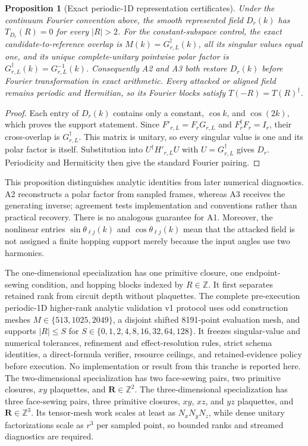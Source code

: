 \documentclass[11pt]{article}
\newenvironment{prospective}{\color{prospectivered}}{}
\newtheorem{proposition}{Proposition}
\begin{document}
\begin{prospective}
\begin{proposition}[Exact periodic-1D representation certificates]
Under the continuum Fourier convention above, the smooth represented field $D_r(k)$
has $T_{D_r}(R)=0$ for every $|R|>2$. For the constant-subspace control, the exact candidate-to-reference overlap
is $M(k)=G_{r,L}^\dagger(k)$, all its singular values equal one, and its unique
complete-unitary pointwise polar factor is
$G_{r,L}^\dagger(k)=G_{r,L}^{-1}(k)$. Consequently A2 and A3 both restore $D_r(k)$
before Fourier transformation in exact arithmetic. Every attacked or aligned field
remains periodic and Hermitian, so its Fourier blocks satisfy
$T(-R)=T(R)^\dagger$.
\end{proposition}

\begin{proof}
Each entry of $D_r(k)$ contains only a constant, $\cos k$, and $\cos(2k)$, which proves
the support statement. Since $F'_{r,L}=F_rG_{r,L}$ and
$F_r^\dagger F_r=I_r$, their cross-overlap is $G_{r,L}^\dagger$. This matrix is unitary,
so every singular value is one and its polar factor is itself. Substitution into
$U^\dagger H'_{r,L}U$ with $U=G_{r,L}^\dagger$ gives $D_r$. Periodicity and Hermiticity
then give the standard Fourier pairing.
\end{proof}

This proposition distinguishes analytic identities from later numerical diagnostics.
A2 reconstructs a polar factor from sampled frames, whereas A3 receives the generating
inverse; agreement tests implementation and conventions rather than practical recovery.
There is no analogous guarantee for A1. Moreover, the nonlinear entries
$\sin\theta_{\ell j}(k)$ and $\cos\theta_{\ell j}(k)$ mean that the attacked field is not
assigned a finite hopping support merely because the input angles use two harmonics.

The one-dimensional specialization has one primitive closure, one endpoint-sewing
condition, and hopping blocks indexed by $R\in\mathbb Z$. It first separates retained
rank from circuit depth without plaquettes. The complete pre-execution periodic-1D higher-rank analytic validation v1 protocol
uses odd construction meshes $M\in\{513,1025,2049\}$, a disjoint shifted 8191-point
evaluation mesh, and supports $|R|\leq S$ for
$S\in\{0,1,2,4,8,16,32,64,128\}$. It freezes singular-value and numerical tolerances,
refinement and effect-resolution rules, strict schema identities, a direct-formula
verifier, resource ceilings, and retained-evidence policy before execution. No
implementation or result from this tranche is reported here. The
two-dimensional specialization has two
face-sewing pairs, two primitive closures, $xy$ plaquettes, and
$\mathbf R\in\mathbb Z^2$. The three-dimensional specialization has three face-sewing
pairs, three primitive closures, $xy$, $xz$, and $yz$ plaquettes, and
$\mathbf R\in\mathbb Z^3$. Its tensor-mesh work scales at least as $N_xN_yN_z$, while
dense unitary factorizations scale as $r^3$ per sampled point, so bounded ranks and
streamed diagnostics are required.


\end{prospective}
\end{document}
